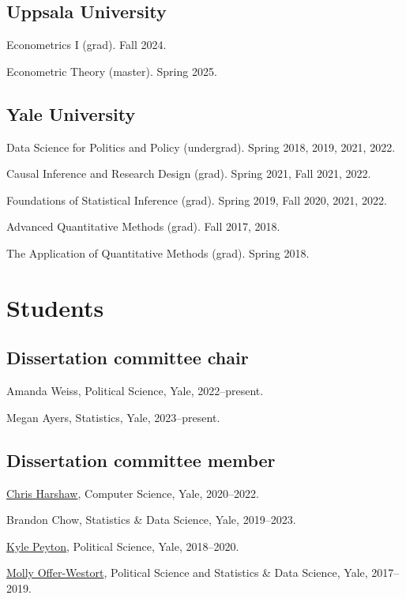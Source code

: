 \documentclass[10pt,letterpaper]{article}
\newenvironment{infolist}{
	\begin{list}{}{
		\setlength{\parskip}{0pt}
		\setlength{\itemsep}{4pt}
		\setlength{\parsep}{0.3em}
		\setlength{\leftmargin}{0em}
		\setlength{\labelwidth}{0em}
		}
	}{
\end{list}
}
\newcommand{\infoitem}[1]{\item {#1}}
\begin{document}
	\subsection*{Uppsala University}

	\begin{infolist}
		\infoitem{Econometrics I (grad). Fall 2024.}
		\infoitem{Econometric Theory (master). Spring 2025.}
	\end{infolist}

	\subsection*{Yale University}

	\begin{infolist}
		\infoitem{Data Science for Politics and Policy (undergrad). Spring 2018, 2019, 2021, 2022.}
		\infoitem{Causal Inference and Research Design (grad). Spring 2021, Fall 2021, 2022.}
		\infoitem{Foundations of Statistical Inference (grad). Spring 2019, Fall 2020, 2021, 2022.}
		\infoitem{Advanced Quantitative Methods (grad). Fall 2017, 2018.}
		\infoitem{The Application of Quantitative Methods (grad). Spring 2018.}
	\end{infolist}


	\section*{Students}

	\subsection*{Dissertation committee chair}

	\begin{infolist}
		\infoitem{Amanda Weiss, Political Science, Yale, 2022--present.}
		\infoitem{Megan Ayers, Statistics, Yale, 2023--present.}
	\end{infolist}

	\subsection*{Dissertation committee member}

	\begin{infolist}
		\infoitem{\href{http://www.chrisharshaw.com/}{Chris Harshaw}, Computer Science, Yale, 2020--2022.}
		\infoitem{Brandon Chow, Statistics \& Data Science, Yale, 2019--2023.}
		\infoitem{\href{https://kylepeyton.github.io}{Kyle Peyton}, Political Science, Yale, 2018--2020.}
		\infoitem{\href{https://mollyow.github.io}{Molly Offer-Westort}, Political Science and Statistics \& Data Science, Yale, 2017--2019.}
	\end{infolist}
\end{document}
